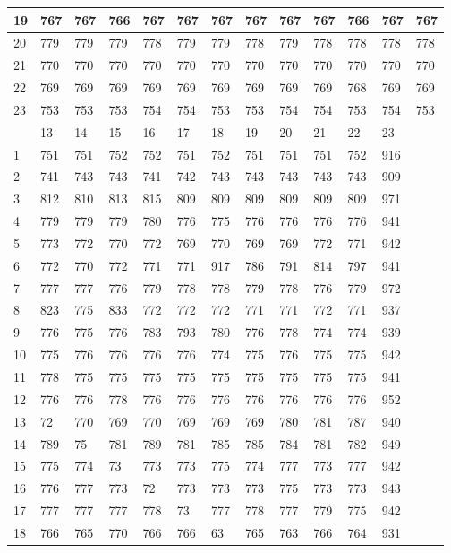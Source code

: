 \documentclass[10pt]{article}
\begin{document}
\begin{table}[h]
\begin{center}
\begin{tabular}{|l|l|l|l|l|l|l|l|l|l|l|l|l|}
\hline
19 & 767 & 767 & 766 & 767 & 767 & 767 & 767 & 767 & 767 & 766 & 767 & 767 \\
\hline
20 & 779 & 779 & 779 & 778 & 779 & 779 & 778 & 779 & 778 & 778 & 778 & 778 \\
\hline
21 & 770 & 770 & 770 & 770 & 770 & 770 & 770 & 770 & 770 & 770 & 770 & 770 \\
\hline
22 & 769 & 769 & 769 & 769 & 769 & 769 & 769 & 769 & 769 & 768 & 769 & 769 \\
\hline
23 & 753 & 753 & 753 & 754 & 754 & 753 & 753 & 754 & 754 & 753 & 754 & 753 \\
\hline
 & 13 & 14 & 15 & 16 & 17 & 18 & 19 & 20 & 21 & 22 & 23 &  \\
\hline
1 & 751 & 751 & 752 & 752 & 751 & 752 & 751 & 751 & 751 & 752 & 916 &  \\
\hline
2 & 741 & 743 & 743 & 741 & 742 & 743 & 743 & 743 & 743 & 743 & 909 &  \\
\hline
3 & 812 & 810 & 813 & 815 & 809 & 809 & 809 & 809 & 809 & 809 & 971 &  \\
\hline
4 & 779 & 779 & 779 & 780 & 776 & 775 & 776 & 776 & 776 & 776 & 941 &  \\
\hline
5 & 773 & 772 & 770 & 772 & 769 & 770 & 769 & 769 & 772 & 771 & 942 &  \\
\hline
6 & 772 & 770 & 772 & 771 & 771 & 917 & 786 & 791 & 814 & 797 & 941 &  \\
\hline
7 & 777 & 777 & 776 & 779 & 778 & 778 & 779 & 778 & 776 & 779 & 972 &  \\
\hline
8 & 823 & 775 & 833 & 772 & 772 & 772 & 771 & 771 & 772 & 771 & 937 &  \\
\hline
9 & 776 & 775 & 776 & 783 & 793 & 780 & 776 & 778 & 774 & 774 & 939 &  \\
\hline
10 & 775 & 776 & 776 & 776 & 776 & 774 & 775 & 776 & 775 & 775 & 942 &  \\
\hline
11 & 778 & 775 & 775 & 775 & 775 & 775 & 775 & 775 & 775 & 775 & 941 &  \\
\hline
12 & 776 & 776 & 778 & 776 & 776 & 776 & 776 & 776 & 776 & 776 & 952 &  \\
\hline
13 & 72 & 770 & 769 & 770 & 769 & 769 & 769 & 780 & 781 & 787 & 940 &  \\
\hline
14 & 789 & 75 & 781 & 789 & 781 & 785 & 785 & 784 & 781 & 782 & 949 &  \\
\hline
15 & 775 & 774 & 73 & 773 & 773 & 775 & 774 & 777 & 773 & 777 & 942 &  \\
\hline
16 & 776 & 777 & 773 & 72 & 773 & 773 & 773 & 775 & 773 & 773 & 943 &  \\
\hline
17 & 777 & 777 & 777 & 778 & 73 & 777 & 778 & 777 & 779 & 775 & 942 &  \\
\hline
18 & 766 & 765 & 770 & 766 & 766 & 63 & 765 & 763 & 766 & 764 & 931 &  \\
\hline
\end{tabular}
\end{center}
\end{table}
\end{document}
